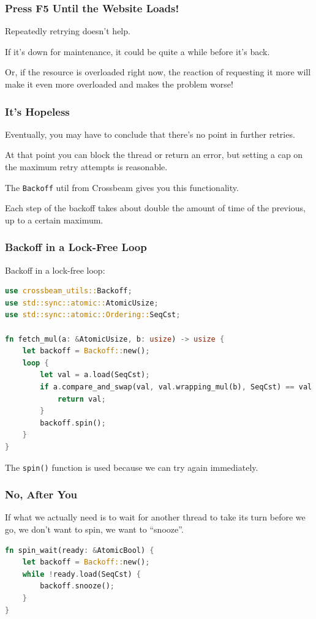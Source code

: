 \begin{frame}
\frametitle{Press F5 Until the Website Loads!}

Repeatedly retrying doesn't help. 

If it's down for maintenance, it could be quite a while before it's back.

Or, if the resource is overloaded right now, the reaction of requesting it more will make it even more overloaded and makes the problem worse! 


\end{frame}


\begin{frame}
\frametitle{It's Hopeless}

Eventually, you may have to conclude that there's no point in further retries. 

At that point you can block the thread or return an error, but setting a cap on the maximum retry attempts is reasonable.

The \texttt{Backoff} util from Crossbeam gives you this functionality. 

Each step of the backoff takes about double the amount of time of the previous, up to a certain maximum.

\end{frame}

\begin{frame}[fragile]
\frametitle{Backoff in a Lock-Free Loop}

Backoff in a lock-free loop:

\begin{lstlisting}[language=Rust]
use crossbeam_utils::Backoff;
use std::sync::atomic::AtomicUsize;
use std::sync::atomic::Ordering::SeqCst;

fn fetch_mul(a: &AtomicUsize, b: usize) -> usize {
    let backoff = Backoff::new();
    loop {
        let val = a.load(SeqCst);
        if a.compare_and_swap(val, val.wrapping_mul(b), SeqCst) == val {
            return val;
        }
        backoff.spin();
    }
}
\end{lstlisting}

The \texttt{spin()} function is used because we can try again immediately.

\end{frame}


\begin{frame}[fragile]
\frametitle{No, After You}


If what we actually need is to wait for another thread to take its turn before we go, we don't want to spin, we want to ``snooze''.

\begin{lstlisting}[language=Rust]
fn spin_wait(ready: &AtomicBool) {
    let backoff = Backoff::new();
    while !ready.load(SeqCst) {
        backoff.snooze();
    }
}
\end{lstlisting}


\end{frame}



